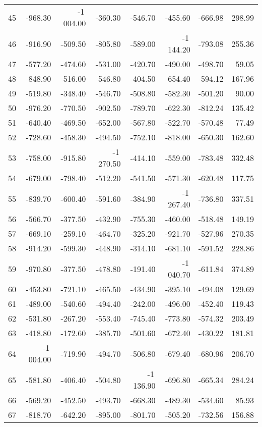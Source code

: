 \begin{longtable}{rrrrrrrr}
45 & -968.30 & -1\,004.00 & -360.30 & -546.70 & -455.60 & -666.98 & 298.99  \\
46 & -916.90 & -509.50 & -805.80 & -589.00 & -1\,144.20 & -793.08 & 255.36  \\
47 & -577.20 & -474.60 & -531.00 & -420.70 & -490.00 & -498.70 & 59.05  \\
48 & -848.90 & -516.00 & -546.80 & -404.50 & -654.40 & -594.12 & 167.96  \\
49 & -519.80 & -348.40 & -546.70 & -508.80 & -582.30 & -501.20 & 90.00  \\
50 & -976.20 & -770.50 & -902.50 & -789.70 & -622.30 & -812.24 & 135.42  \\
51 & -640.40 & -469.50 & -652.00 & -567.80 & -522.70 & -570.48 & 77.49  \\
52 & -728.60 & -458.30 & -494.50 & -752.10 & -818.00 & -650.30 & 162.60  \\
53 & -758.00 & -915.80 & -1\,270.50 & -414.10 & -559.00 & -783.48 & 332.48  \\
54 & -679.00 & -798.40 & -512.20 & -541.50 & -571.30 & -620.48 & 117.75  \\
55 & -839.70 & -600.40 & -591.60 & -384.90 & -1\,267.40 & -736.80 & 337.51  \\
56 & -566.70 & -377.50 & -432.90 & -755.30 & -460.00 & -518.48 & 149.19  \\
57 & -669.10 & -259.10 & -464.70 & -325.20 & -921.70 & -527.96 & 270.35  \\
58 & -914.20 & -599.30 & -448.90 & -314.10 & -681.10 & -591.52 & 228.86  \\
59 & -970.80 & -377.50 & -478.80 & -191.40 & -1\,040.70 & -611.84 & 374.89  \\
60 & -453.80 & -721.10 & -465.50 & -434.90 & -395.10 & -494.08 & 129.69  \\
61 & -489.00 & -540.60 & -494.40 & -242.00 & -496.00 & -452.40 & 119.43  \\
62 & -531.80 & -267.20 & -553.40 & -745.40 & -773.80 & -574.32 & 203.49  \\
63 & -418.80 & -172.60 & -385.70 & -501.60 & -672.40 & -430.22 & 181.81  \\
64 & -1\,004.00 & -719.90 & -494.70 & -506.80 & -679.40 & -680.96 & 206.70  \\
65 & -581.80 & -406.40 & -504.80 & -1\,136.90 & -696.80 & -665.34 & 284.24  \\
66 & -569.20 & -452.50 & -493.70 & -668.30 & -489.30 & -534.60 & 85.93  \\
67 & -818.70 & -642.20 & -895.00 & -801.70 & -505.20 & -732.56 & 156.88  \\

\end{longtable}
